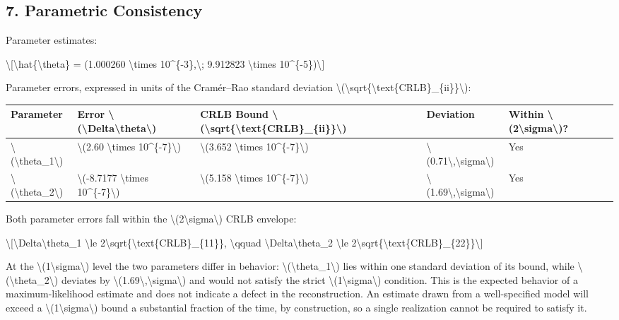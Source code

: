 \documentclass[
  10pt,
]{article}
\begin{document}
\hypertarget{parametric-consistency}{%
\subsection{7. Parametric Consistency}\label{parametric-consistency}}

Parameter estimates:

\textbackslash{[}\textbackslash hat\{\textbackslash theta\} = (1.000260
\textbackslash times 10\^{}\{-3\},\textbackslash; 9.912823
\textbackslash times 10\^{}\{-5\})\textbackslash{]}

Parameter errors, expressed in units of the Cramér--Rao standard
deviation
\textbackslash(\textbackslash sqrt\{\textbackslash text\{CRLB\}\_\{ii\}\}\textbackslash):

\begin{longtable}[]{@{}lllll@{}}
\toprule\noalign{}
Parameter & Error
\textbackslash(\textbackslash Delta\textbackslash theta\textbackslash) &
CRLB Bound
\textbackslash(\textbackslash sqrt\{\textbackslash text\{CRLB\}\_\{ii\}\}\textbackslash)
& Deviation & Within
\textbackslash(2\textbackslash sigma\textbackslash)? \\
\midrule\noalign{}
\endhead
\bottomrule\noalign{}
\endlastfoot
\textbackslash(\textbackslash theta\_1\textbackslash) &
\textbackslash(2.60 \textbackslash times 10\^{}\{-7\}\textbackslash) &
\textbackslash(3.652 \textbackslash times 10\^{}\{-7\}\textbackslash) &
\textbackslash(0.71\textbackslash,\textbackslash sigma\textbackslash) &
Yes \\
\textbackslash(\textbackslash theta\_2\textbackslash) &
\textbackslash(-8.7177 \textbackslash times 10\^{}\{-7\}\textbackslash)
& \textbackslash(5.158 \textbackslash times 10\^{}\{-7\}\textbackslash)
& \textbackslash(1.69\textbackslash,\textbackslash sigma\textbackslash)
& Yes \\
\end{longtable}

Both parameter errors fall within the
\textbackslash(2\textbackslash sigma\textbackslash) CRLB envelope:

\textbackslash{[}\textbar\textbackslash Delta\textbackslash theta\_1\textbar{}
\textbackslash le
2\textbackslash sqrt\{\textbackslash text\{CRLB\}\_\{11\}\},
\textbackslash qquad
\textbar\textbackslash Delta\textbackslash theta\_2\textbar{}
\textbackslash le
2\textbackslash sqrt\{\textbackslash text\{CRLB\}\_\{22\}\}\textbackslash{]}

At the \textbackslash(1\textbackslash sigma\textbackslash) level the two
parameters differ in behavior:
\textbackslash(\textbackslash theta\_1\textbackslash) lies within one
standard deviation of its bound, while
\textbackslash(\textbackslash theta\_2\textbackslash) deviates by
\textbackslash(1.69\textbackslash,\textbackslash sigma\textbackslash)
and would not satisfy the strict
\textbackslash(1\textbackslash sigma\textbackslash) condition. This is
the expected behavior of a maximum-likelihood estimate and does not
indicate a defect in the reconstruction. An estimate drawn from a
well-specified model will exceed a
\textbackslash(1\textbackslash sigma\textbackslash) bound a substantial
fraction of the time, by construction, so a single realization cannot be
required to satisfy it.
\end{document}
